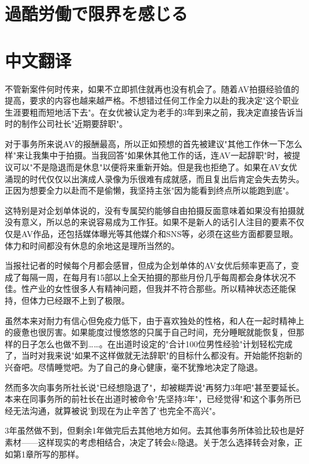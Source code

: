 \documentclass[12pt,UTF8]{ctexbook}
\begin{document}
\section{過酷労働で限界を感じる}



\section*{中文翻译}

不管新案件何时传来，如果不立即抓住就再也没有机会了。随着AV拍摄经验值的提高，要求的内容也越来越严格。不想错过任何工作全力以赴的我决定"这个职业生涯要粗而短地活下去"。在女优被认定为老手的3年到来之前，我决定直接告诉当时的制作公司社长"近期要辞职"。

对于事务所来说AV的报酬最高，所以正如预想的首先被建议"其他工作休一下怎么样"来让我集中于拍摄。当我回答"如果休其他工作的话，连AV一起辞职"时，被提议可以"不是隐退而是休息"以便将来重新开始。但是我也拒绝了。如果在AV女优涌现的时代仅仅以出演成人录像为乐很难有成就感，而且复出后肯定会失去势头。正因为想要全力以赴而不是偷懒，我坚持主张"因为能看到终点所以能跑到底"。

这特别是对企划单体说的，没有专属契约能够自由拍摄反面意味着如果没有拍摄就没有意义，所以总的来说容易成为工作狂。如果不是新人的话引人注目的要素不仅仅是AV作品，还包括媒体曝光等其他媒介和SNS等，必须在这些方面都要显眼。体力和时间都没有休息的余地这是理所当然的。

当报社记者的时候每个月都会感冒，但成为企划单体的AV女优后频率更高了，变成了每隔一周，在每月有15部以上全天拍摄的那些月份几乎每周都会身体状况不佳。性产业的女性很多人有精神问题，但我并不符合那些。所以精神状态还能保持，但体力已经跟不上到了极限。

虽然本来对耐力有信心但免疫力低下，由于喜欢独处的性格，和人在一起时精神上的疲惫也很厉害。如果能度过慢悠悠的只属于自己时间，充分睡眠就能恢复，但那样的日子怎么也做不到……。在出道时设定的"合计100位男性经验"计划轻松完成了，当时对我来说"如果不这样做就无法辞职"的目标什么都没有。开始能怀抱新的兴奋吧。尽情睡觉吧。为了自己的身心健康，毫不犹豫地决定了隐退。

然而多次向事务所社长说"已经想隐退了"，却被糊弄说"再努力3年吧"甚至要延长。本来在同事务所的前社长在出道时被命令"先坚持3年"，已经觉得"和这个事务所已经无法沟通，就算被说'到现在为止辛苦了'也完全不高兴"。

3年虽然做不到，但剩余1年做完后去其他地方如何。去其他事务所体验比较也是好素材——这样现实的考虑相结合，决定了转会\&隐退。关于怎么选择转会对象，正如第1章所写的那样。
\end{document}
